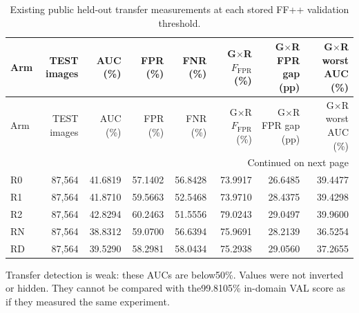 \documentclass[10pt]{article}
\begin{document}
\begin{longtable}{@{}lrrrrrrr@{}}
\caption{Existing public held-out transfer measurements at each stored FF++ validation threshold.}\\
\toprule
Arm & TEST images & AUC (\%) & FPR (\%) & FNR (\%) & G$\times$R $F_{\mathrm{FPR}}$ (\%) & G$\times$R FPR gap (pp) & G$\times$R worst AUC (\%) \\
\midrule
\endfirsthead
\toprule
Arm & TEST images & AUC (\%) & FPR (\%) & FNR (\%) & G$\times$R $F_{\mathrm{FPR}}$ (\%) & G$\times$R FPR gap (pp) & G$\times$R worst AUC (\%) \\
\midrule
\endhead
\midrule
\multicolumn{8}{r}{Continued on next page}\\
\endfoot
\bottomrule
\endlastfoot
R0 & 87,564 & 41.6819 & 57.1402 & 56.8428 & 73.9917 & 26.6485 & 39.4477 \\
R1 & 87,564 & 41.8710 & 59.5663 & 52.5468 & 73.9710 & 28.4375 & 39.4298 \\
R2 & 87,564 & 42.8294 & 60.2463 & 51.5556 & 79.0243 & 29.0497 & 39.9600 \\
RN & 87,564 & 38.8312 & 59.0700 & 56.6394 & 75.9691 & 28.2139 & 36.5254 \\
RD & 87,564 & 39.5290 & 58.2981 & 58.0434 & 75.2938 & 29.0560 & 37.2655 \\
\end{longtable}

Transfer detection is weak: these AUCs are below50\%. Values were not inverted or hidden. They cannot be compared with the99.8105\% in-domain VAL score as if they measured the same experiment.
\end{document}
